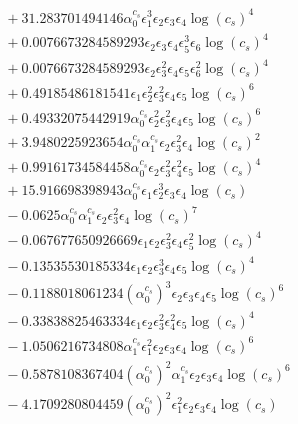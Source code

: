 \documentclass[10pt]{article}
\begin{document}
\begin{align*}
&{}  + 31.283701494146 \alpha_{0}^{c_s} \epsilon_{1}^{3} \epsilon_{2} \epsilon_{3} \epsilon_{4} \log{\left(c_{s} \right)}^{4} \\
&{}  + 0.0076673284589293 \epsilon_{2} \epsilon_{3} \epsilon_{4} \epsilon_{5}^{3} \epsilon_{6} \log{\left(c_{s} \right)}^{4} \\
&{}  + 0.0076673284589293 \epsilon_{2} \epsilon_{3}^{2} \epsilon_{4} \epsilon_{5} \epsilon_{6}^{2} \log{\left(c_{s} \right)}^{4} \\
&{}  + 0.49185486181541 \epsilon_{1} \epsilon_{2}^{2} \epsilon_{3}^{2} \epsilon_{4} \epsilon_{5} \log{\left(c_{s} \right)}^{6} \\
&{}  + 0.49332075442919 \alpha_{0}^{c_s} \epsilon_{2}^{2} \epsilon_{3}^{2} \epsilon_{4} \epsilon_{5} \log{\left(c_{s} \right)}^{6} \\
&{}  + 3.9480225923654 \alpha_{0}^{c_s} \alpha_{1}^{c_s} \epsilon_{2} \epsilon_{3}^{2} \epsilon_{4} \log{\left(c_{s} \right)}^{2} \\
&{}  + 0.99161734584458 \alpha_{0}^{c_s} \epsilon_{2} \epsilon_{3}^{2} \epsilon_{4}^{2} \epsilon_{5} \log{\left(c_{s} \right)}^{4} \\
&{}  + 15.916698398943 \alpha_{0}^{c_s} \epsilon_{1} \epsilon_{2}^{3} \epsilon_{3} \epsilon_{4} \log{\left(c_{s} \right)} \\
&{}  - 0.0625 \alpha_{0}^{c_s} \alpha_{1}^{c_s} \epsilon_{2} \epsilon_{3}^{2} \epsilon_{4} \log{\left(c_{s} \right)}^{7} \\
&{}  - 0.067677650926669 \epsilon_{1} \epsilon_{2} \epsilon_{3}^{2} \epsilon_{4} \epsilon_{5}^{2} \log{\left(c_{s} \right)}^{4} \\
&{}  - 0.13535530185334 \epsilon_{1} \epsilon_{2} \epsilon_{3}^{3} \epsilon_{4} \epsilon_{5} \log{\left(c_{s} \right)}^{4} \\
&{}  - 0.1188018061234 \left(\alpha_{0}^{c_s}\right)^{3} \epsilon_{2} \epsilon_{3} \epsilon_{4} \epsilon_{5} \log{\left(c_{s} \right)}^{6} \\
&{}  - 0.33838825463334 \epsilon_{1} \epsilon_{2} \epsilon_{3}^{2} \epsilon_{4}^{2} \epsilon_{5} \log{\left(c_{s} \right)}^{4} \\
&{}  - 1.0506216734808 \alpha_{1}^{c_s} \epsilon_{1}^{2} \epsilon_{2} \epsilon_{3} \epsilon_{4} \log{\left(c_{s} \right)}^{6} \\
&{}  - 0.5878108367404 \left(\alpha_{0}^{c_s}\right)^{2} \alpha_{1}^{c_s} \epsilon_{2} \epsilon_{3} \epsilon_{4} \log{\left(c_{s} \right)}^{6} \\
&{}  - 4.1709280804459 \left(\alpha_{0}^{c_s}\right)^{2} \epsilon_{1}^{2} \epsilon_{2} \epsilon_{3} \epsilon_{4} \log{\left(c_{s} \right)} \\

\end{align*}
\end{document}
